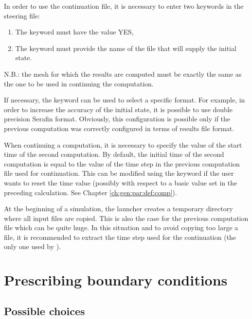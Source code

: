  In order to use the continuation file, it is necessary to enter two keywords in the steering file:

\begin{enumerate}
\item  The keyword  must have the value YES,

\item  The keyword  must provide the name of the file that will supply the initial state.
\end{enumerate}

 N.B.: the mesh for which the results are computed must be exactly the same as the one to be used in continuing the computation.

 If necessary, the keyword  can be used to select a specific format. For example, in order to increase the accuracy of the initial state, it is possible to use double precision Serafin format. Obviously, this configuration is possible only if the previous computation was correctly configured in terms of results file format.

 When continuing a computation, it is necessary to specify the value of the start time of the second computation. By default, the initial time of the second computation is equal to the value of the time step in the previous computation file used for continuation. This can be modified using the keyword  if the user wants to reset the time value (possibly with respect to a basic value set in the preceding calculation. See Chapter \ref{ch:gen:par:def:comp}).

 At the beginning of a simulation, the launcher creates a temporary directory where all input files are copied. This is also the case for the previous computation file which can be quite huge. In this situation and to avoid copying too large a file, it is recommended to extract the time step used for the continuation (the only one used by ).


\section{ Prescribing boundary conditions}
\label{sec:presc:bc}

\subsection{ Possible choices}

